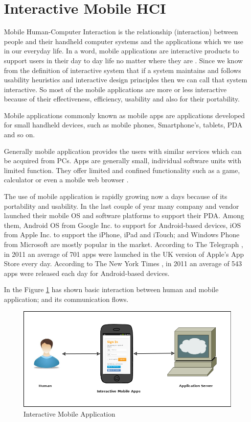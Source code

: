 \section{Interactive Mobile HCI}
\label{sec:IMA}
Mobile Human-Computer Interaction is the relationship (interaction) between
people and their handheld computer systems and the applications which we use in
our everyday life. In a word, mobile applications are interactive products to
support users in their day to day life no matter where they are 
\cite{Love:2005:UMH:1076935}. Since we know from the definition of
interactive system that if a system maintains and follows usability heuristics
and interactive design principles then we can call that system interactive. So
most of the mobile applications are more or less interactive because of their
effectiveness, efficiency, usability and also for their portability.

Mobile applications commonly known as mobile apps are applications developed for
small handheld devices, such as mobile phones, Smartphone's, tablets, PDA and so
on.

Generally mobile application provides the users with similar services which can
be acquired from PCs. Apps are generally small, individual software units with
limited function. They offer limited and confined functionality such as a game,
calculator or even a mobile web browser \cite{JanssenMobileApp}.

The use of mobile application is rapidly growing now a days because of its
portability and usability. In the last couple of year many company and vendor
launched their mobile OS and software platforms to support their PDA. Among
them, Android OS from Google Inc. to support for Android-based devices, iOS from
Apple Inc. to support the iPhone, iPad and iTouch; and Windows Phone from
Microsoft are mostly popular in the market. According to The Telegraph
\cite{Barnett:appslaunched}, in 2011 an average of 701 apps were launched in the
UK version of Apple's App Store every day.  According to The New York Times
\cite{Freierman:appslaunched}, in 2011 an average of 543 apps were released each
day for Android-based devices.

In the Figure \ref{fig:InteractiveMobileApplication} has shown basic interaction
between human and mobile application; and its communication flows.

\begin{figure}[h!t]
    \centering
      \includegraphics[width=5.5in]{ch2/InteractiveMobileApplication/InteractiveMobileApplication}
  \caption{Interactive Mobile Application}
  \label{fig:InteractiveMobileApplication}
\end{figure}
\newpage
